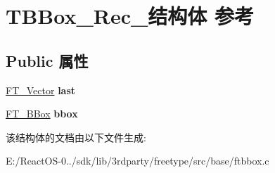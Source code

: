 \hypertarget{struct_t_b_box___rec__}{}\section{T\+B\+Box\+\_\+\+Rec\+\_\+结构体 参考}
\label{struct_t_b_box___rec__}
\subsection*{Public 属性}
\begin{DoxyCompactItemize}
\item 
\mbox{\label{struct_t_b_box___rec___a27057a98ea2c8980d209f7893434ea63}} 
\hyperlink{struct_f_t___vector__}{F\+T\+\_\+\+Vector} {\bfseries last}
\item 
\mbox{\label{struct_t_b_box___rec___a121fd60f108925862eebe7aa5a432820}} 
\hyperlink{struct_f_t___b_box__}{F\+T\+\_\+\+B\+Box} {\bfseries bbox}
\end{DoxyCompactItemize}


该结构体的文档由以下文件生成\+:\begin{DoxyCompactItemize}
\item 
E\+:/\+React\+O\+S-\/0../sdk/lib/3rdparty/freetype/src/base/ftbbox.\+c\end{DoxyCompactItemize}
